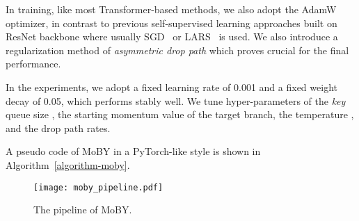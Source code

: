 \documentclass{article}
\begin{document}
In training, like most Transformer-based methods, we also adopt the AdamW~\citep{adam,adamw} optimizer, in contrast to previous self-supervised learning approaches built on ResNet backbone where usually SGD~\citep{moco,pic} or LARS~\citep{simclr,byol,pixpro} is used. We also introduce a regularization method of \emph{asymmetric drop path} which proves crucial for the final performance.

In the experiments, we adopt a fixed learning rate of 0.001 and a fixed weight decay of 0.05, which performs stably well. We tune hyper-parameters of the \emph{key} queue size , the starting momentum value of the target branch, the temperature , and the drop path rates. 

A pseudo code of MoBY in a PyTorch-like style is shown in Algorithm~\ref{algorithm-moby}.

\begin{figure}[h]
\centering
\texttt{[image: moby\_pipeline.pdf]}
\caption{The pipeline of MoBY.}
\label{fig-moby}
\end{figure}
\end{document}
